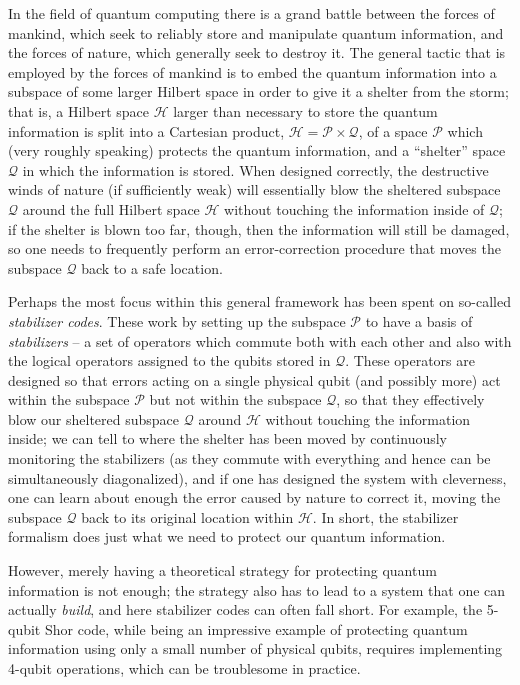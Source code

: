 \documentclass[twocolumn,showpacs,preprintnumbers,amsmath,amssymb,nofootinbib,pra,floatfix]{revtex4}
\begin{document}
In the field of quantum computing there is a grand battle between the forces of mankind, which seek to reliably store and manipulate quantum information, and the forces of nature, which generally seek to destroy it.  The general tactic that is employed by the forces of mankind is to embed the quantum information into a subspace of some larger Hilbert space in order to give it a shelter from the storm;  that is, a Hilbert space $\mathscr{H}$ larger than necessary to store the quantum information is split into a Cartesian product, $\mathscr{H}=\mathscr{P}\times\mathscr{Q}$, of a space $\mathscr{P}$ which (very roughly speaking) protects the quantum information, and a ``shelter'' space $\mathscr{Q}$ in which the information is stored.  When designed correctly, the destructive winds of nature (if sufficiently weak) will essentially blow the sheltered subspace $\mathscr{Q}$ around the full Hilbert space $\mathscr{H}$ without touching the information inside of $\mathscr{Q}$;  if the shelter is blown too far, though, then the information will still be damaged, so one needs to frequently perform an error-correction procedure that moves the subspace $\mathscr{Q}$ back to a safe location.

Perhaps the most focus within this general framework has been spent on so-called \emph{stabilizer codes}.  These work by setting up the subspace $\mathscr{P}$ to have a basis of \emph{stabilizers} -- a set of operators which commute both with each other and also with the logical operators assigned to the qubits stored in $\mathscr{Q}$.  These operators are designed so that errors acting on a single physical qubit (and possibly more) act within the subspace $\mathscr{P}$ but not within the subspace $\mathscr{Q}$, so that they effectively blow our sheltered subspace $\mathscr{Q}$ around $\mathscr{H}$ without touching the information inside;  we can tell to where the shelter has been moved by continuously monitoring the stabilizers (as they commute with everything and hence can be simultaneously diagonalized), and if one has designed the system with cleverness, one can learn about enough the error caused by nature to correct it, moving the subspace $\mathscr{Q}$ back to its original location within $\mathscr{H}$.  In short, the stabilizer formalism does  just what we need to protect our quantum information.

However, merely having a theoretical strategy for protecting quantum information is not enough;  the strategy also has to lead to a system that one can actually \emph{build}, and here stabilizer codes can often fall short.  For example, the 5-qubit Shor code, while being an impressive example of protecting quantum information using only a small number of physical qubits, requires implementing 4-qubit operations, which can be troublesome in practice.
\end{document}
